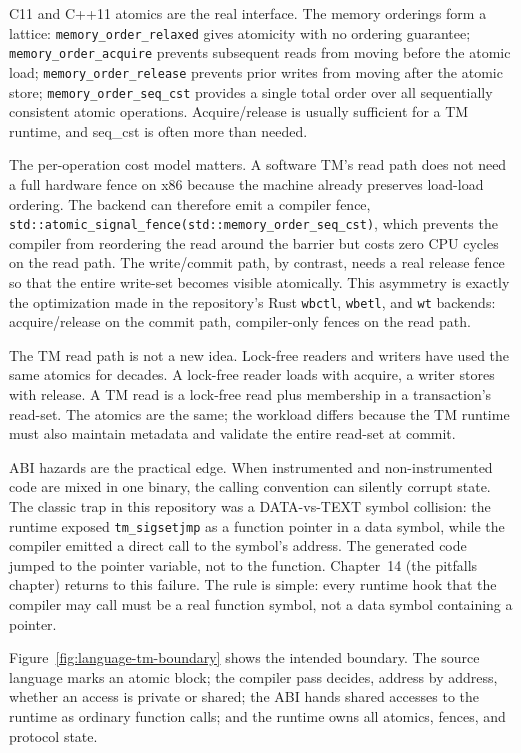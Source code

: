 C11 and C++11 atomics are the real interface. The memory orderings form a
lattice: \texttt{memory\_order\_relaxed} gives atomicity with no ordering
guarantee; \texttt{memory\_order\_acquire} prevents subsequent reads from moving
before the atomic load; \texttt{memory\_order\_release} prevents prior writes
from moving after the atomic store; \texttt{memory\_order\_seq\_cst} provides a
single total order over all sequentially consistent atomic operations.
Acquire/release is usually sufficient for a TM runtime, and seq\_cst is often
more than needed.

The per-operation cost model matters. A software TM's read path does not need a
full hardware fence on x86 because the machine already preserves load-load
ordering. The backend can therefore emit a compiler fence,
\texttt{std::atomic\_\allowbreak signal\_fence}\allowbreak\texttt{(std::memory\_\allowbreak order\_seq\_cst)}, which prevents
the compiler from reordering the read around the barrier but costs zero CPU
cycles on the read path. The write/commit path, by contrast, needs a real
release fence so that the entire write-set becomes visible atomically. This
asymmetry is exactly the optimization made in the repository's Rust
\texttt{wbctl}, \texttt{wbetl}, and \texttt{wt} backends: acquire/release on
the commit path, compiler-only fences on the read path.

The TM read path is not a new idea. Lock-free readers and writers have used the
same atomics for decades. A lock-free reader loads with acquire, a writer
stores with release. A TM read is a lock-free read plus membership in a
transaction's read-set. The atomics are the same; the workload differs because
the TM runtime must also maintain metadata and validate the entire read-set at
commit.

ABI hazards are the practical edge. When instrumented and non-instrumented
code are mixed in one binary, the calling convention can silently corrupt
state. The classic trap in this repository was a DATA-vs-TEXT symbol
collision: the runtime exposed \texttt{tm\_sigsetjmp} as a function pointer in
a data symbol, while the compiler emitted a direct call to the symbol's
address. The generated code jumped to the pointer variable, not to the
function. Chapter~14 (the pitfalls chapter) returns to this failure. The rule is simple:
every runtime hook that the compiler may call must be a real function symbol,
not a data symbol containing a pointer.

Figure~\ref{fig:language-tm-boundary} shows the intended boundary. The source
language marks an atomic block; the compiler pass decides, address by address,
whether an access is private or shared; the ABI hands shared accesses to the
runtime as ordinary function calls; and the runtime owns all atomics, fences,
and protocol state.

